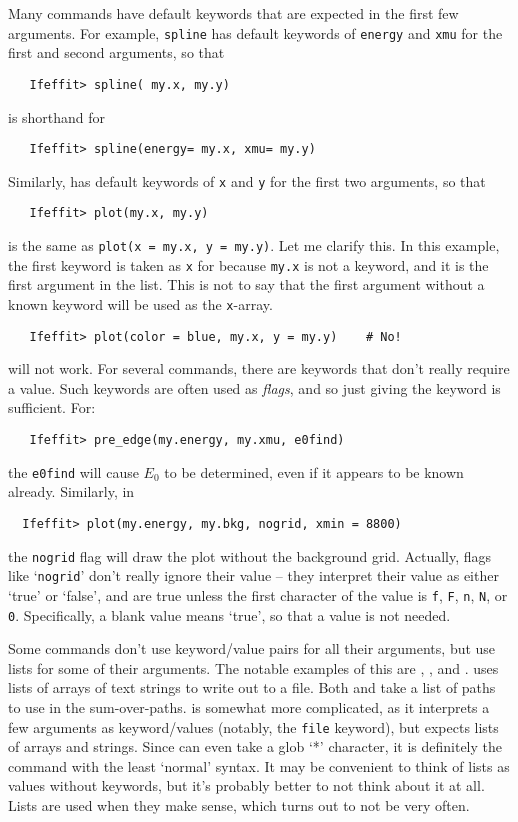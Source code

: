 Many commands have default keywords that are expected in the first few
arguments.  For example, {\texttt{spline}} has default keywords of
{\texttt{energy}} and {\texttt{xmu}} for the first and second arguments, so
that
\begin{verbatim}
   Ifeffit> spline( my.x, my.y)
\end{verbatim}
\noindent
is shorthand for
\begin{verbatim}
   Ifeffit> spline(energy= my.x, xmu= my.y)
\end{verbatim}
\noindent
Similarly, {} has default keywords of {\tt{x}} and {\tt{y}} for
the first two arguments, so that
\begin{verbatim}
   Ifeffit> plot(my.x, my.y)
\end{verbatim}
\noindent
is the same as {\tt{plot(x = my.x, y = my.y)}}.  Let me clarify this.  In
this example, the first keyword is taken as {\tt{x}} for {}
because {\tt{my.x}} is not a keyword, and it is the first argument in the
list.  This is not to say that the first argument without a known keyword
will be used as the {\tt{x}}-array.
\begin{verbatim}
   Ifeffit> plot(color = blue, my.x, y = my.y)    # No!
\end{verbatim}
\noindent
will not work.  For several commands, there are keywords that don't really
require a value.  Such keywords are often used as {\emph{flags}}, and so
just giving the keyword is sufficient. For:
\begin{verbatim}
   Ifeffit> pre_edge(my.energy, my.xmu, e0find)
\end{verbatim}
\noindent
the {\tt{e0find}} will cause $E_0$ to be determined, even if it appears to
be known already.  Similarly, in 
\begin{verbatim}
  Ifeffit> plot(my.energy, my.bkg, nogrid, xmin = 8800)
\end{verbatim}
\noindent
the {\tt{nogrid}} flag will draw the plot without the background grid.
Actually, flags like `{\tt{nogrid}}' don't really ignore their value --
they interpret their value as either `true' or `false', and are true unless
the first character of the value is {\tt{f}}, {\tt{F}}, {\tt{n}}, {\tt{N}},
or {\tt{0}}.  Specifically, a blank value means `true', so that a
value is not needed. 


Some commands don't use keyword/value pairs for all their arguments, but
use lists for some of their arguments.  The notable examples of this are
{}, {}, and {}.
{} uses lists of arrays of text strings to write out to a
file.  Both {} and {} take a list of {\feff}
paths to use in the sum-over-paths.  {} is somewhat more
complicated, as it interprets a few arguments as keyword/values (notably,
the {\tt{file}} keyword), but expects lists of arrays and strings.  Since
{} can even take a glob `*' character, it is definitely
the command with the least `normal' syntax.  It may be convenient to think
of lists as values without keywords, but it's probably better to not think
about it at all.  Lists are used when they make sense, which turns out to
not be very often.


